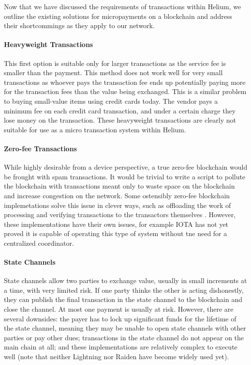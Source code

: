 \documentclass[letterpaper,11pt]{article}
\begin{document}
Now that we have discussed the requirements of transactions within Helium, we outline the existing solutions for micropayments on a blockchain and address their shortcommings as they apply to our network.

\paragraph{Heavyweight Transactions}
This first option is suitable only for larger transactions as the service fee is smaller than the payment. This method does not work well for very small transactions as whoever pays the transaction fee ends up potentially paying more for the transaction fees than the value being exchanged. This is a similar problem to buying small-value items using credit cards today. The vendor pays a minimum fee on each credit card transaction, and under a certain charge they lose money on the transaction. These heavyweight transactions are clearly not suitable for use as a micro transaction system within Helium.

\paragraph{Zero-fee Transactions}
While highly desirable from a device perspective, a true zero-fee blockchain would be frought with spam transactions. It would be trivial to write a script to pollute the blockchain with transactions meant only to waste space on the blockchain and increase congestion on the network. Some ostensibly zero-fee blockchain implemetations solve this issue in clever ways, such as offloading the work of processing and verifying transactions to the transactors themselves \cite{iota}. However, these implementations have their own issues, for example IOTA has not yet proved it is capable of operating this type of system without tne need for a centralized coordinator.

\paragraph{State Channels}
State channels \cite{state-channels} allow two parties to exchange value, usually in small increments at a time, with very limited risk. If one party thinks the other is acting dishonestly, they can publish the final transaction in the state channel to the blockchain and close the channel. At most one payment is usually at risk. However, there are several downsides: the payer has to lock up significant funds for the lifetime of the state channel, meaning they may be unable to open state channels with other parties or pay other dues; transactions in the state channel do not appear on the main chain at all; and these implementations are relatively complex to execute well (note that neither Lightning \cite{lightning} nor Raiden \cite{raiden} have become widely used yet).
\end{document}
